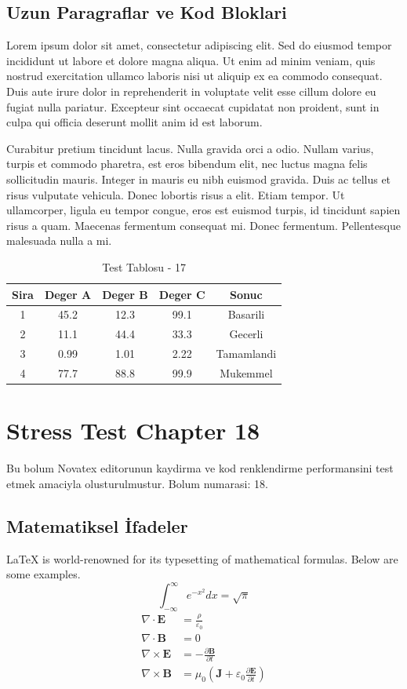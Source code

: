 \documentclass[12pt,a4paper]{article}
\begin{document}
\subsection{Uzun Paragraflar ve Kod Bloklari}
Lorem ipsum dolor sit amet, consectetur adipiscing elit. Sed do eiusmod tempor incididunt ut labore et dolore magna aliqua. Ut enim ad minim veniam, quis nostrud exercitation ullamco laboris nisi ut aliquip ex ea commodo consequat. Duis aute irure dolor in reprehenderit in voluptate velit esse cillum dolore eu fugiat nulla pariatur. Excepteur sint occaecat cupidatat non proident, sunt in culpa qui officia deserunt mollit anim id est laborum.

Curabitur pretium tincidunt lacus. Nulla gravida orci a odio. Nullam varius, turpis et commodo pharetra, est eros bibendum elit, nec luctus magna felis sollicitudin mauris. Integer in mauris eu nibh euismod gravida. Duis ac tellus et risus vulputate vehicula. Donec lobortis risus a elit. Etiam tempor. Ut ullamcorper, ligula eu tempor congue, eros est euismod turpis, id tincidunt sapien risus a quam. Maecenas fermentum consequat mi. Donec fermentum. Pellentesque malesuada nulla a mi.

\begin{table}[h!]
\centering
\begin{tabular}{|c|c|c|c|c|}
\hline
\textbf{Sira} & \textbf{Deger A} & \textbf{Deger B} & \textbf{Deger C} & \textbf{Sonuc} \\
\hline
1 & 45.2 & 12.3 & 99.1 & Basarili \\
2 & 11.1 & 44.4 & 33.3 & Gecerli \\
3 & 0.99 & 1.01 & 2.22 & Tamamlandi \\
4 & 77.7 & 88.8 & 99.9 & Mukemmel \\
\hline
\end{tabular}
\caption{Test Tablosu - 17}
\end{table}

\newpage
\section{Stress Test Chapter 18}
Bu bolum Novatex editorunun kaydirma ve kod renklendirme performansini test etmek amaciyla olusturulmustur. Bolum numarasi: 18.

\subsection{Matematiksel İfadeler}
\LaTeX{} is world-renowned for its typesetting of mathematical formulas. Below are some examples.
\begin{equation}
\int_{-\infty}^{\infty} e^{-x^2} dx = \sqrt{\pi}
\end{equation}
\begin{align}
\nabla \cdot \mathbf{E} &= \frac{\rho}{\varepsilon_0} \\
\nabla \cdot \mathbf{B} &= 0 \\
\nabla \times \mathbf{E} &= -\frac{\partial \mathbf{B}}{\partial t} \\
\nabla \times \mathbf{B} &= \mu_0\left(\mathbf{J} + \varepsilon_0 \frac{\partial \mathbf{E}}{\partial t}\right)
\end{align}
\end{document}
